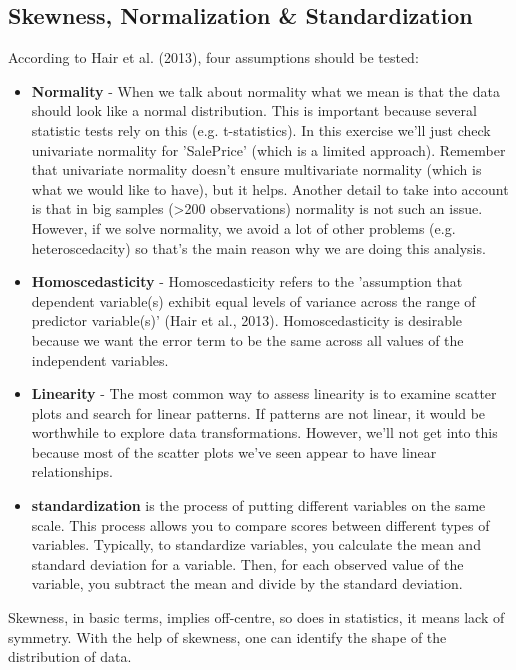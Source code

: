 \documentclass[11pt, a4paper , landscape]{article}
\begin{document}
    \subsection{Skewness, Normalization \&
Standardization}\label{skewness-normalization-standardization}

    According to Hair et al. (2013), four assumptions should be tested:

\begin{itemize}
\item
  \textbf{Normality} - When we talk about normality what we mean is that
  the data should look like a normal distribution. This is important
  because several statistic tests rely on this (e.g. t-statistics). In
  this exercise we'll just check univariate normality for 'SalePrice'
  (which is a limited approach). Remember that univariate normality
  doesn't ensure multivariate normality (which is what we would like to
  have), but it helps. Another detail to take into account is that in
  big samples (\textgreater{}200 observations) normality is not such an
  issue. However, if we solve normality, we avoid a lot of other
  problems (e.g. heteroscedacity) so that's the main reason why we are
  doing this analysis.
\item
  \textbf{Homoscedasticity} - Homoscedasticity refers to the 'assumption
  that dependent variable(s) exhibit equal levels of variance across the
  range of predictor variable(s)' (Hair et al., 2013). Homoscedasticity
  is desirable because we want the error term to be the same across all
  values of the independent variables.
\item
  \textbf{Linearity} - The most common way to assess linearity is to
  examine scatter plots and search for linear patterns. If patterns are
  not linear, it would be worthwhile to explore data transformations.
  However, we'll not get into this because most of the scatter plots
  we've seen appear to have linear relationships.
\item
  \textbf{standardization} is the process of putting different variables
  on the same scale. This process allows you to compare scores between
  different types of variables. Typically, to standardize variables, you
  calculate the mean and standard deviation for a variable. Then, for
  each observed value of the variable, you subtract the mean and divide
  by the standard deviation.
\end{itemize}

Skewness, in basic terms, implies off-centre, so does in statistics, it
means lack of symmetry. With the help of skewness, one can identify the
shape of the distribution of data.
\end{document}
